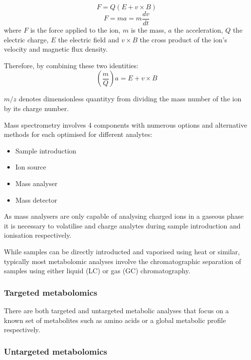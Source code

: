 \[ F = Q(E + v \times B)\]
\[ F = ma = m\frac{dv}{dt}\]
where \(F\) is the force applied to the ion, \(m\) is the mass, \(a\) the acceleration, \(Q\) the electric charge,
\(E\) the electric field and \(v\times B\) the cross product of the ion's velocity and magnetic flux density. 

Therefore, by combining these two identities:
\[(\frac{m}{Q}) a = E + v \times B\]


\(m/z\) denotes dimensionless quantityy from dividing the mass number of the ion by its charge number.


Mass spectrometry involves 4 components with numerous options and alternative methods for each
optimised for different analytes:
\begin{itemize}
    \item Sample introduction
    \item Ion source
    \item Mass analyser
    \item Mass detector 
\end{itemize}

As mass analysers are only capable of analysing charged ions in a gaseous phase it is necessary to volatilise 
and charge analytes during sample introduction and ionisation respectively. 

While samples can be directly introducted and vaporised using heat or similar, typically most metabolomic
analyses involve the chromatographic separation of samples using either liquid (LC) or gas (GC) chromatography.








\subsubsection{Targeted metabolomics}

There are both targeted and untargeted metabolic analyses that focus on a known set of metabolites such as
amino acids or a global metabolic profile respectively. 





\subsubsection{Untargeted metabolomics}








